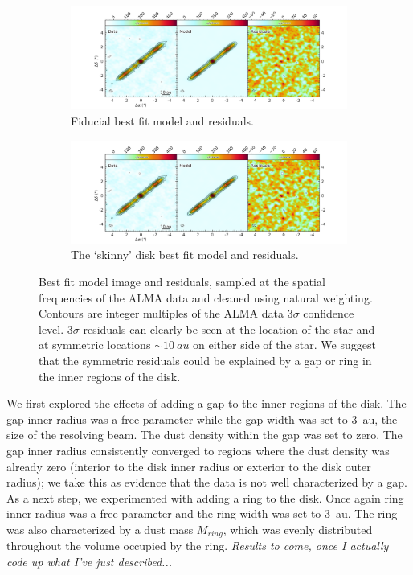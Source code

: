 \documentclass[12pt,oneside]{article}
\begin{document}
\begin{figure}
  
  \begin{subfigure}[b]{\linewidth}
  \includegraphics[width=\linewidth]{figures/fiducial_best_fit}
  \caption{Fiducial best fit model and residuals. }
  \label{fig: fiducial}
  \end{subfigure}
  
  \begin{subfigure}[b]{\linewidth}
  \includegraphics[width=\linewidth]{figures/skinny_best_fit}
  \caption{The `skinny' disk best fit model and residuals.}
  \label{fig: skinny}
  \end{subfigure}
  \caption{Best fit model image and residuals, sampled at the spatial frequencies of the ALMA data and cleaned using natural weighting. Contours are integer multiples of the ALMA data $3\sigma$ confidence level. $3\sigma$ residuals can clearly be seen at the location of the star and at symmetric locations $\sim \SI{10}{au}$ on either side of the star. We suggest that the symmetric residuals could be explained by a gap or ring in the inner regions of the disk.}
\end{figure}


We first explored the effects of adding a gap  to the inner regions of the disk. 
The gap inner radius was a free parameter while the gap width was set to \SI{3}{au}, the size of the resolving beam. 
The dust density within the gap was set to zero.
The gap inner radius consistently converged to regions where the dust density was already zero (interior to the disk inner radius or exterior to the disk outer radius); we take this as evidence that the data is not well characterized by a gap. 
As a next step, we experimented with adding a ring to the disk. 
Once again ring inner radius was a free parameter and the ring width was set to \SI{3}{au}.
The ring was also characterized by a dust mass $M_{ring}$, which was evenly distributed throughout the volume occupied by the ring. \textit{Results to come, once I actually code up what I've just described...}
\end{document}
